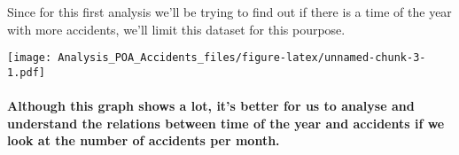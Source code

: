 \documentclass[]{article}
\newenvironment{Shaded}{\begin{snugshade}}{\end{snugshade}}
\newcommand{\KeywordTok}[1]{\textcolor[rgb]{0.13,0.29,0.53}{\textbf{#1}}}
\newcommand{\DataTypeTok}[1]{\textcolor[rgb]{0.13,0.29,0.53}{#1}}
\newcommand{\StringTok}[1]{\textcolor[rgb]{0.31,0.60,0.02}{#1}}
\newcommand{\OperatorTok}[1]{\textcolor[rgb]{0.81,0.36,0.00}{\textbf{#1}}}
\newcommand{\NormalTok}[1]{#1}
\let\oldparagraph\paragraph
\renewcommand{\paragraph}[1]{\oldparagraph{#1}\mbox{}}
\begin{document}
Since for this first analysis we'll be trying to find out if there is a
time of the year with more accidents, we'll limit this dataset for this
pourpose.

\begin{Shaded}
\end{Shaded}

\texttt{[image: Analysis\_POA\_Accidents\_files/figure-latex/unnamed-chunk-3-1.pdf]}

\paragraph{Although this graph shows a lot, it's better for us to
analyse and understand the relations between time of the year and
accidents if we look at the number of accidents per
month.}\label{although-this-graph-shows-a-lot-its-better-for-us-to-analyse-and-understand-the-relations-between-time-of-the-year-and-accidents-if-we-look-at-the-number-of-accidents-per-month.}
\end{document}

